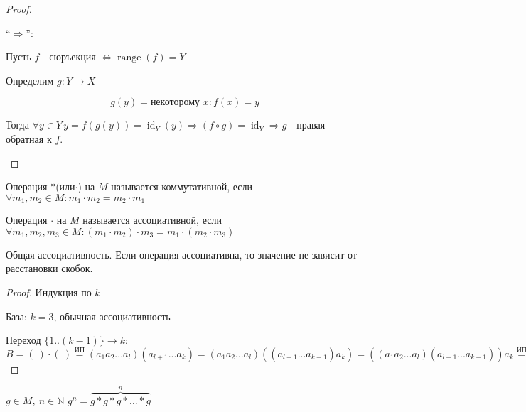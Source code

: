 \begin{proof}
\begin{enumerate}
    ``$\Longrightarrow$'':
    
    Пусть $f$ - сюръекция $\Leftrightarrow \operatorname{range}(f) = Y$
    
    Определим $g : Y \rightarrow X$
    
    \[ g(y) = \mbox{некоторому } x : f(x) = y \]
    
    Тогда $\forall y \in Y \, y = f(g(y)) = \operatorname{id}_Y(y) 
    \Rightarrow
    (f \circ g) = \operatorname{id}_Y \Rightarrow g$ - 
    правая обратная к $f$.

\end{enumerate}
\end{proof}    

\begin{conj}
    Операция $*$(или$\cdot$) на $M$ называется коммутативной, если $\forall m_1, m_2 \in M : m_1\cdot m_2 = m_2\cdot m_1$
\end{conj}
\begin{conj}
    Операция $\cdot$ на $M$ называется ассоциативной, если $\forall m_1, m_2, m_3 \in M: (m_1\cdot m_2)\cdot m_3 = m_1\cdot(m_2\cdot m_3)$
\end{conj}
\begin{theorem-non}
Общая ассоциативность. Если операция ассоциативна, то 
значение не зависит от расстановки скобок.
\end{theorem-non}
\begin{proof}
Индукция по $k$

База: $k=3$, обычная ассоциативность

Переход $\{1..(k-1)\} \to k$: \\
$B = (\ )\cdot(\ ) \overset{\text{ИП}}{=} (a_1a_2...a_l)(a_{l+1}...a_k) 
= (a_1a_2...a_l)((a_{l+1}...a_{k-1})a_k) = 
((a_1a_2...a_l)(a_{l+1}...a_{k-1}))a_k \overset{\text{ИП}}{=}
(a_1a_2...a_{k-1})a_k = a_1a_2...a_k$
\end{proof}
\begin{conj}
    $g \in M,\ n \in \mathbb{N}$ $g^n=\overbrace{g*g*g*...*g}^n$
\end{conj}

